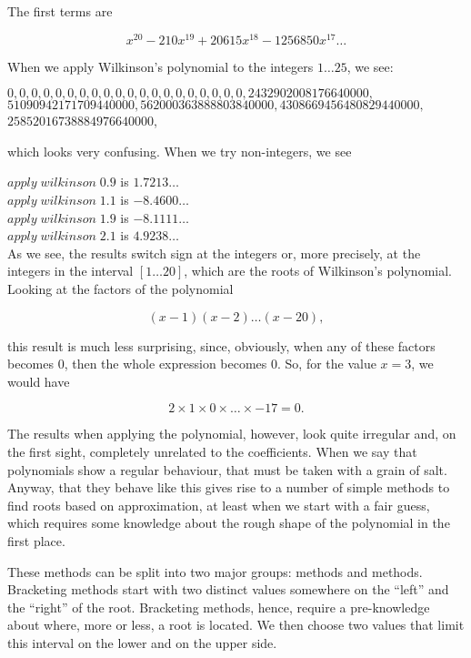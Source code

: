 \documentclass[tikz]{scrreprt}
\newcommand{\Varid}[1]{\mathit{#1}}
\begin{document}
The first terms are

\[
x^{20} - 210x^{19} + 20615x^{18} - 1256850x^{17} \dots
\]

When we apply Wilkinson's polynomial to the integers $1\dots 25$, we see:

\ensuremath{\mathrm{0},\mathrm{0},\mathrm{0},\mathrm{0},\mathrm{0},\mathrm{0},\mathrm{0},\mathrm{0},\mathrm{0},\mathrm{0},\mathrm{0},\mathrm{0},\mathrm{0},\mathrm{0},\mathrm{0},\mathrm{0},\mathrm{0},\mathrm{0},\mathrm{0},\mathrm{0},\mathrm{2432902008176640000},}\\
\ensuremath{\mathrm{51090942171709440000},\mathrm{562000363888803840000},\mathrm{4308669456480829440000},}\\
\ensuremath{\mathrm{25852016738884976640000}},

which looks very confusing. When we try non-integers, we see

\ensuremath{\Varid{apply}\;\Varid{wilkinson}\;\mathrm{0.9}} is $1.7213\dots$\\
\ensuremath{\Varid{apply}\;\Varid{wilkinson}\;\mathrm{1.1}} is $-8.4600\dots$\\
\ensuremath{\Varid{apply}\;\Varid{wilkinson}\;\mathrm{1.9}} is $-8.1111\dots$\\
\ensuremath{\Varid{apply}\;\Varid{wilkinson}\;\mathrm{2.1}} is $4.9238\dots$\\

As we see, the results switch sign at the integers or,
more precisely, at the integers in the interval $[1\dots 20]$,
which are the roots of Wilkinson's polynomial.
Looking at the factors of the polynomial

\[
(x-1)(x-2)\dots (x-20),
\]

this result is much less surprising, since, obviously,
when any of these factors becomes 0, then the whole
expression becomes 0. So, for the value $x=3$, we would have

\[
2 \times 1 \times 0 \times \dots \times -17 = 0.
\]

The results when applying the polynomial, however,
look quite irregular and, on the first sight,
completely unrelated to the coefficients.
When we say that polynomials show a regular behaviour,
that must be taken with a grain of salt.
Anyway, that they behave like this 
gives rise to a number of simple
methods to find roots based on approximation,
at least when we start with a fair guess,
which requires some knowledge about the rough shape
of the polynomial in the first place.

These methods can be split into two major groups:
 methods and  methods.
Bracketing methods start with two distinct values
somewhere on the ``left'' and the ``right'' of
the root. Bracketing methods, hence, require a
pre-knowledge about where, more or less, a root
is located. We then choose two values that limit
this interval on the lower and on the upper side.
\end{document}
